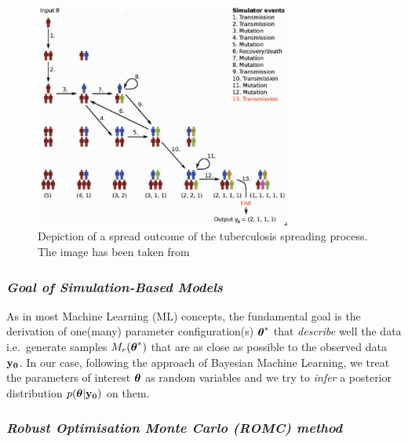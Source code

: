 \begin{figure}[!ht]
    \begin{center}
      \includegraphics[width=0.75\textwidth]{./Thesis/images/chapter1/tuber_model_1.png}
    \end{center}
    \caption{Depiction of a spread outcome of the tuberculosis spreading process. The image has been taken from \autocite{Lintusaari2017}}
    \label{fig:tuberculosis_model}
\end{figure}

\subsubsection*{\textit{Goal of Simulation-Based Models}}

As in most Machine Learning (ML) concepts, the fundamental goal is the
derivation of one(many) parameter configuration(s) $\boldsymbol{\theta}^*$ that
\textit{describe} well the data i.e.\ generate samples
$M_r(\boldsymbol{\theta}^*)$ that are as close as possible to the observed data
$\mathbf{y_0}$. In our case, following the approach of Bayesian Machine
Learning, we treat the parameters of interest $\boldsymbol{\theta}$ as random
variables and we try to \textit{infer} a posterior distribution
$p(\boldsymbol{\theta}|\mathbf{y_0})$ on them. 

\subsubsection*{\textit{Robust Optimisation Monte Carlo (ROMC) method}}


